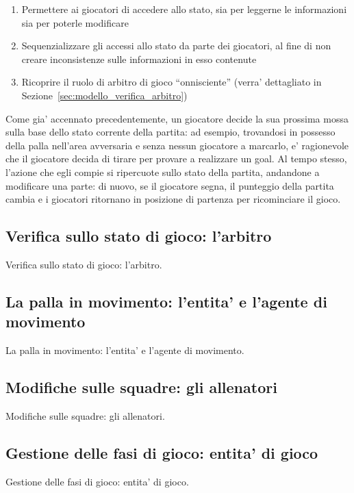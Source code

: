 \begin{enumerate}
	\item Permettere ai giocatori di accedere allo stato, sia per leggerne le informazioni sia per poterle modificare
	\item Sequenzializzare gli accessi allo stato da parte dei giocatori, al fine di non creare inconsistenze sulle informazioni in esso contenute
	\item Ricoprire il ruolo di arbitro di gioco ``onnisciente'' (verra' dettagliato in Sezione~\ref{sec:modello_verifica_arbitro})
\end{enumerate}

Come gia' accennato precedentemente, un giocatore decide la sua prossima mossa sulla base dello stato corrente della partita: ad esempio, trovandosi in possesso della palla nell'area avversaria e senza nessun giocatore a marcarlo, e' ragionevole che il giocatore decida di tirare per provare a realizzare un goal. Al tempo stesso, l'azione che egli compie si ripercuote sullo stato della partita, andandone a modificare una parte: di nuovo, se il giocatore segna, il punteggio della partita cambia e i giocatori ritornano in posizione di partenza per ricominciare il gioco.

\subsection*{Verifica sullo stato di gioco: l'arbitro}
%
\label{sec:modello_verifica_arbitro}

Verifica sullo stato di gioco: l'arbitro.

\subsection*{La palla in movimento: l'entita' e l'agente di movimento}
%
\label{sec:modello_palla_agente_movimento}

La palla in movimento: l'entita' e l'agente di movimento.

\subsection*{Modifiche sulle squadre: gli allenatori}
%
\label{sec:modello_squadre_allenatori}

Modifiche sulle squadre: gli allenatori.

\subsection*{Gestione delle fasi di gioco: entita' di gioco}
%
\label{sec:modello_fasi_game_entity}

Gestione delle fasi di gioco: entita' di gioco.
